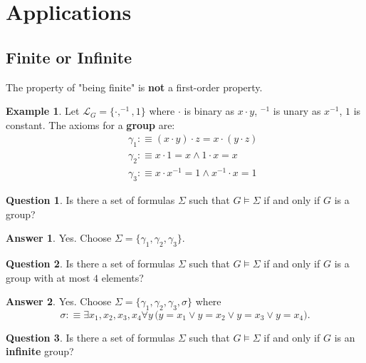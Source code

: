 \documentclass[11pt,letterpaper]{book}
\theoremstyle{definition}
\newtheorem{example}{Example}[section]
\newtheorem{question}{Question}[section]
\newtheorem{answer}{Answer}[section]
\begin{document}
\section{Applications}

\subsection{Finite or Infinite}

The property of "being finite" is \textbf{not} a first-order property.

\begin{example}
    \label{example:infinite_group}
     Let $\mathcal{L}_{G} = \{ \cdot, ^{-1}, 1 \}$ where $\cdot$ is binary
as $x \cdot y $, $^{-1}$ is unary as $x^{-1}$, $1$ is constant. The
axioms for a \textbf{group} are:
     \begin{eqnarray*}
& &    \gamma_1 :\equiv (x \cdot y ) \cdot z = x \cdot (y \cdot z) \\
& &  \gamma_2 :\equiv x \cdot 1 = x \land 1 \cdot x = x \\
& & \gamma_3 :\equiv x \cdot x^{-1} = 1 \land x^{-1} \cdot x = 1
     \end{eqnarray*}

     \begin{question}
       Is there a set of formulas $\Sigma$ such that $G  \models \Sigma $
if and only if $G$ is a group?
     \end{question}
     \begin{answer}
       Yes. Choose $\Sigma = \{ \gamma_1, \gamma_2, \gamma_3 \}$.
     \end{answer}

     \begin{question}
       Is there a set of formulas $\Sigma$ such that $G \models \Sigma $
if and only if $G$ is a group with at most $4$ elements?
     \end{question}

     \begin{answer}
       Yes. Choose $\Sigma = \{\gamma_1, \gamma_2, \gamma_3, \sigma \}$ 
where
$$ \sigma :\equiv \exists x_1, x_2, x_3, x_4 \forall y \,  \big( y = x_1
\lor y = x_2 \lor y = x_3 \lor y = x_4 \big). $$
     \end{answer}

     \begin{question}
       Is there a set of formulas $\Sigma$ such that $G \models \Sigma $
if and only if $G$ is an \textbf{infinite} group?
     \end{question}


\end{example}
\end{document}
